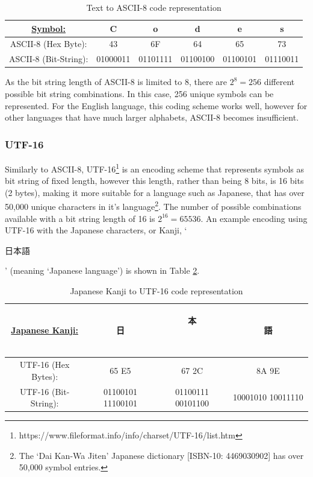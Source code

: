 \documentclass[12pt]{article}
\begin{document}
\begin{table}[H]
\centering
\begin{tabular}{|c|c|c|c|c|c|}
	\hline
	\underline{Symbol:} & C & o & d & e & s \\
	\hline
	ASCII-8 (Hex Byte): & 43 & 6F & 64 & 65 & 73 \\
	\hline
	ASCII-8 (Bit-String): & ‭01000011‬ & ‭01101111‬ & ‭01100100‬ & ‭01100101‬ & ‭01110011‬ \\
	\hline
\end{tabular}
\caption{Text to ASCII-8 code representation}
\label{text2ascii}
\end{table}

As the bit string length of ASCII-8 is limited to 8, there are $2^8=256$ different possible bit string combinations. In this case, 256 unique symbols can be represented. For the English language, this coding scheme works well, however for other languages that have much larger alphabets, ASCII-8 becomes insufficient.

\subsubsection{UTF-16}
Similarly to ASCII-8, UTF-16\footnote{https://www.fileformat.info/info/charset/UTF-16/list.htm} is an encoding scheme that represents symbols as bit string of fixed length, however this length, rather than being 8 bits, is 16 bits (2 bytes), making it more suitable for a language such as Japanese, that has over 50,000 unique characters in it's language\footnote{The `Dai Kan-Wa Jiten' Japanese dictionary [ISBN-10: 4469030902] has over 50,000 symbol entries.}. The number of possible combinations available with a bit string length of 16 is $2^{16}=65536$. An example encoding using UTF-16 with the Japanese characters, or Kanji, `\begin{CJK}{UTF8}{min}日本語\end{CJK}' (meaning `Japanese language') is shown in Table \ref{kanji2utf16}.

\begin{table}[H]
	\centering
	\begin{tabular}{|c|c|c|c|}
		\hline
		\underline{Japanese Kanji:} & \begin{CJK}{UTF8}{min}日\end{CJK} & \begin{CJK}{UTF8}{min}本\end{CJK}　& \begin{CJK}{UTF8}{min}語\end{CJK} \\
		\hline
		UTF-16 (Hex Bytes): & 65 E5 & ‭67 2C‬ & ‭8A 9E‬ \\
		\hline
		UTF-16 (Bit-String): & ‭01100101 11100101‬‬ & ‭01100111 00101100‬ & ‭10001010 10011110‬　\\
		\hline
	\end{tabular}
	\caption{Japanese Kanji to UTF-16 code representation}
	\label{kanji2utf16}
\end{table}
\end{document}
